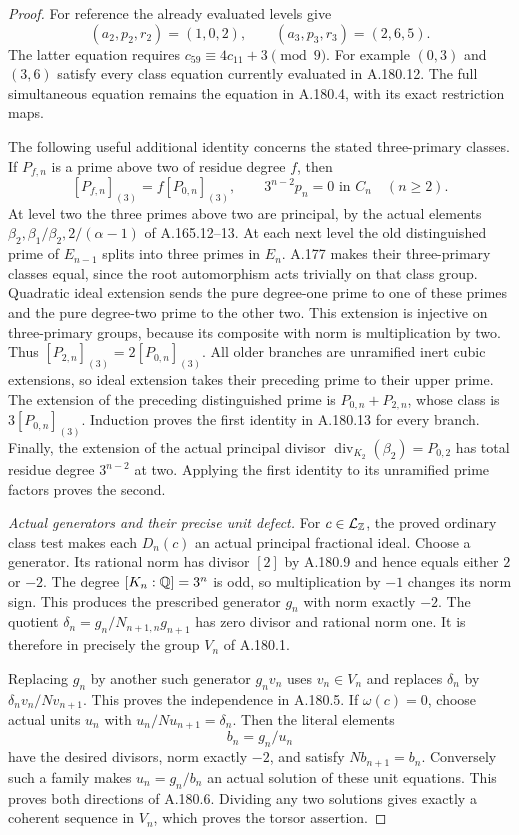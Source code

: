 \begin{proof}
For reference the already evaluated levels give
\[
 (a_2,p_2,r_2)=(1,0,2),\qquad
 (a_3,p_3,r_3)=(2,6,5).
\tag{A.180.12}
\]
The latter equation requires
\(c_{59}\equiv4c_{11}+3\pmod9\).
For example \((0,3)\) and \((3,6)\) satisfy every class equation
currently evaluated in A.180.12.  The full simultaneous equation
remains the equation in A.180.4, with its exact restriction maps.

The following useful additional identity concerns the stated
three-primary classes.  If \(P_{f,n}\) is a prime above two of
residue degree \(f\), then
\[
           [P_{f,n}]_{(3)}=f[P_{0,n}]_{(3)},\qquad
                         3^{n-2}p_n=0\text{ in }C_n
                         \quad(n\ge2).
\tag{A.180.13}
\]
At level two the three primes above two are principal, by the
actual elements \(\beta_2,\beta_1/\beta_2,2/(\alpha-1)\)
of A.165.12--13.  At each next level the old distinguished
prime of \(E_{n-1}\) splits into three primes in \(E_n\).
A.177 makes their three-primary classes equal, since the root
automorphism acts trivially on that class group.  Quadratic ideal
extension sends the pure degree-one prime to one of these primes
and the pure degree-two prime to the other two.  This extension
is injective on three-primary groups, because its composite with
norm is multiplication by two.  Thus
\([P_{2,n}]_{(3)}=2[P_{0,n}]_{(3)}\).
All older branches are unramified inert cubic extensions, so
ideal extension takes their preceding prime to their upper prime.
The extension of the preceding distinguished prime is
\(P_{0,n}+P_{2,n}\), whose class is \(3[P_{0,n}]_{(3)}\).
Induction proves the first identity in A.180.13 for every branch.
Finally, the extension of the actual principal divisor
\(\operatorname{div}_{K_2}(\beta_2)=P_{0,2}\) has total residue
degree \(3^{n-2}\) at two.  Applying the first identity to its
unramified prime factors proves the second.

\emph{Actual generators and their precise unit defect.}
For \(c\in\mathcal L_{\mathbb Z}\), the proved ordinary class test
makes each \(D_n(c)\) an actual principal fractional ideal.
Choose a generator.  Its rational norm has divisor \([2]\)
by A.180.9 and hence equals either \(2\) or \(-2\).
The degree \([K_n:\mathbb Q]=3^n\) is odd, so multiplication by
\(-1\) changes its norm sign.  This produces the prescribed
generator \(g_n\) with norm exactly \(-2\).
The quotient
\(\delta_n=g_n/N_{n+1,n}g_{n+1}\) has zero divisor and
rational norm one.  It is therefore in precisely the group
\(V_n\) of A.180.1.

Replacing \(g_n\) by another such generator \(g_nv_n\)
uses \(v_n\in V_n\) and replaces \(\delta_n\) by
\(\delta_n v_n/Nv_{n+1}\).  This proves the independence
in A.180.5.  If \(\omega(c)=0\), choose actual units \(u_n\)
with \(u_n/Nu_{n+1}=\delta_n\).  Then the literal elements
\[
                              b_n=g_n/u_n
\tag{A.180.14}
\]
have the desired divisors, norm exactly \(-2\), and satisfy
\(N b_{n+1}=b_n\).  Conversely such a family makes
\(u_n=g_n/b_n\) an actual solution of these unit equations.
This proves both directions of A.180.6.  Dividing any two
solutions gives exactly a coherent sequence in \(V_n\),
which proves the torsor assertion.


\end{proof}
